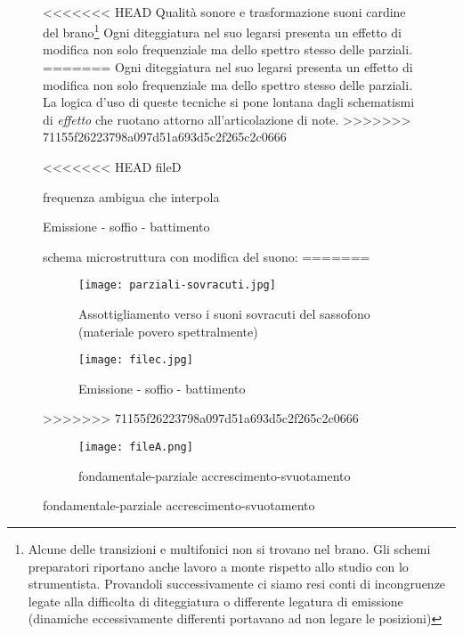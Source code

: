 \begin{figure}
~

\clearpage





<<<<<<< HEAD
Qualità sonore e trasformazione suoni cardine del brano\footnote{Alcune delle transizioni
e multifonici non si trovano nel brano. Gli schemi preparatori riportano anche lavoro a
monte rispetto allo studio con lo strumentista.  Provandoli successivamente ci siamo
resi conti di incongruenze legate alla difficolta di diteggiatura o differente
legatura di emissione (dinamiche eccessivamente differenti portavano ad non legare le posizioni)}
Ogni diteggiatura nel suo legarsi presenta un effetto di modifica non solo
frequenziale ma dello spettro stesso delle parziali.
=======
Ogni diteggiatura nel suo legarsi presenta un effetto di modifica non solo frequenziale ma
dello spettro stesso delle parziali. La logica d'uso di queste tecniche si pone
lontana dagli schematismi di \emph{effetto} che ruotano attorno all'articolazione di note. 
>>>>>>> 71155f26223798a097d51a693d5c2f265c2c0666

\vfill

<<<<<<< HEAD
fileD

frequenza ambigua che interpola

Emissione - soffio - battimento


schema microstruttura con modifica del suono:
=======
\begin{figure}[h]
\centering
{\texttt{[image: parziali-sovracuti.jpg]}}
\caption[Assottigliamento verso i suoni sovracuti]{Assottigliamento verso i suoni sovracuti del sassofono (materiale povero spettralmente)}
\label{fig:assottiglimento}
\end{figure}
 
\vfill

\begin{figure}[h]
\centering
{\texttt{[image: filec.jpg]}}
\caption[Emissione - soffio - battimento]{Emissione - soffio - battimento}
\label{fig:soffio}
\end{figure}
>>>>>>> 71155f26223798a097d51a693d5c2f265c2c0666

\vfill
 
\begin{figure}[h]
\centering
{\texttt{[image: fileA.png]}}
\caption[Passaggio microtonale]{fondamentale-parziale accrescimento-svuotamento}
\label{fig:microtoni}
\end{figure}


\end{figure}
